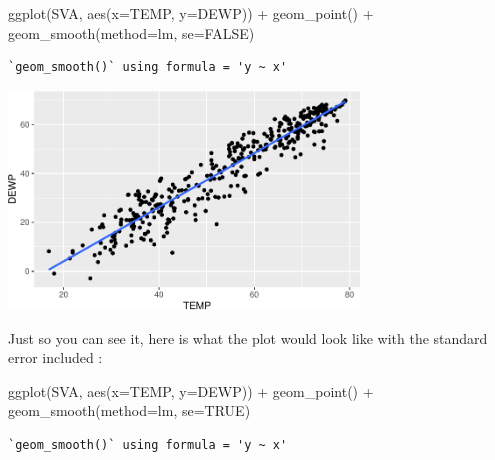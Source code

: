 \documentclass[
  letterpaper,
  DIV=11,
  numbers=noendperiod]{scrreprt}
\newenvironment{Shaded}{\begin{snugshade}}{\end{snugshade}}
\newcommand{\AttributeTok}[1]{\textcolor[rgb]{0.40,0.45,0.13}{#1}}
\newcommand{\ConstantTok}[1]{\textcolor[rgb]{0.56,0.35,0.01}{#1}}
\newcommand{\FunctionTok}[1]{\textcolor[rgb]{0.28,0.35,0.67}{#1}}
\newcommand{\NormalTok}[1]{\textcolor[rgb]{0.00,0.23,0.31}{#1}}
\newcommand{\SpecialCharTok}[1]{\textcolor[rgb]{0.37,0.37,0.37}{#1}}
\newcommand{\StringTok}[1]{\textcolor[rgb]{0.13,0.47,0.30}{#1}}
\begin{document}
\begin{Shaded}
\begin{Highlighting}[]
\FunctionTok{ggplot}\NormalTok{(SVA, }\FunctionTok{aes}\NormalTok{(}\AttributeTok{x=}\NormalTok{TEMP, }\AttributeTok{y=}\NormalTok{DEWP)) }\SpecialCharTok{+}
  \FunctionTok{geom\_point}\NormalTok{() }\SpecialCharTok{+}
  \FunctionTok{geom\_smooth}\NormalTok{(}\AttributeTok{method=}\StringTok{\textquotesingle{}lm\textquotesingle{}}\NormalTok{, }\AttributeTok{se=}\ConstantTok{FALSE}\NormalTok{)}
\end{Highlighting}
\end{Shaded}

\begin{verbatim}
`geom_smooth()` using formula = 'y ~ x'
\end{verbatim}

\begin{center}
\includegraphics[width=0.7\textwidth,height=\textheight]{Linear_Modeling_and_Regression_files/figure-pdf/unnamed-chunk-12-1.pdf}
\end{center}

Just so you can see it, here is what the plot would look like with the
standard error included :

\begin{Shaded}
\begin{Highlighting}[]
\FunctionTok{ggplot}\NormalTok{(SVA, }\FunctionTok{aes}\NormalTok{(}\AttributeTok{x=}\NormalTok{TEMP, }\AttributeTok{y=}\NormalTok{DEWP)) }\SpecialCharTok{+}
  \FunctionTok{geom\_point}\NormalTok{() }\SpecialCharTok{+}
  \FunctionTok{geom\_smooth}\NormalTok{(}\AttributeTok{method=}\StringTok{\textquotesingle{}lm\textquotesingle{}}\NormalTok{, }\AttributeTok{se=}\ConstantTok{TRUE}\NormalTok{)}
\end{Highlighting}
\end{Shaded}

\begin{verbatim}
`geom_smooth()` using formula = 'y ~ x'
\end{verbatim}
\end{document}
